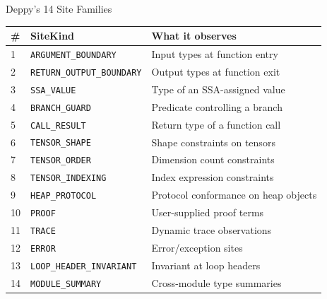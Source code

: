 \documentclass[aspectratio=169,10pt]{beamer}
\begin{document}
\begin{frame}{Deppy's 14 Site Families}
\renewcommand{\arraystretch}{1.15}
\footnotesize
\begin{tabular}{@{}llp{6.5cm}@{}}
\toprule
\textbf{\#} & \textbf{SiteKind} & \textbf{What it observes} \\
\midrule
1 & \texttt{ARGUMENT\_BOUNDARY} & Input types at function entry \\
2 & \texttt{RETURN\_OUTPUT\_BOUNDARY} & Output types at function exit \\
3 & \texttt{SSA\_VALUE} & Type of an SSA-assigned value \\
4 & \texttt{BRANCH\_GUARD} & Predicate controlling a branch \\
5 & \texttt{CALL\_RESULT} & Return type of a function call \\
6 & \texttt{TENSOR\_SHAPE} & Shape constraints on tensors \\
7 & \texttt{TENSOR\_ORDER} & Dimension count constraints \\
8 & \texttt{TENSOR\_INDEXING} & Index expression constraints \\
9 & \texttt{HEAP\_PROTOCOL} & Protocol conformance on heap objects \\
10 & \texttt{PROOF} & User-supplied proof terms \\
11 & \texttt{TRACE} & Dynamic trace observations \\
12 & \texttt{ERROR} & Error/exception sites \\
13 & \texttt{LOOP\_HEADER\_INVARIANT} & Invariant at loop headers \\
14 & \texttt{MODULE\_SUMMARY} & Cross-module type summaries \\
\bottomrule
\end{tabular}
\end{frame}
\end{document}
